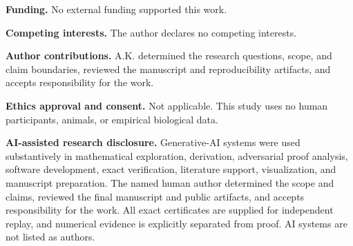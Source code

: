 \medskip
\noindent\textbf{Funding.}
No external funding supported this work.

\medskip
\noindent\textbf{Competing interests.}
The author declares no competing interests.

\medskip
\noindent\textbf{Author contributions.}
A.K. determined the research questions, scope, and claim boundaries, reviewed
the manuscript and reproducibility artifacts, and accepts responsibility for
the work.

\medskip
\noindent\textbf{Ethics approval and consent.}
Not applicable.  This study uses no human participants, animals, or empirical
biological data.

\medskip
\noindent\textbf{AI-assisted research disclosure.}
Generative-AI systems were used substantively in mathematical exploration,
derivation, adversarial proof analysis, software development, exact
verification, literature support, visualization, and manuscript preparation.
The named human author determined the scope and claims, reviewed the final
manuscript and public artifacts, and accepts responsibility for the work.  All
exact certificates are supplied for independent replay, and numerical
evidence is explicitly separated from proof.  AI systems are not listed as
authors.
